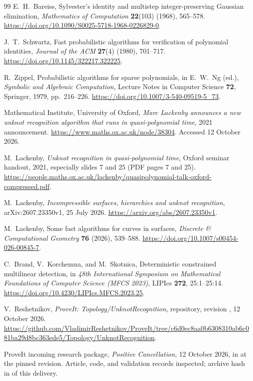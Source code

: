 \begin{thebibliography}{99}
E.~H.~Bareiss, Sylvester's identity and multistep integer-preserving
Gaussian elimination, \emph{Mathematics of Computation}
\textbf{22}(103) (1968), 565--578.
\url{https://doi.org/10.1090/S0025-5718-1968-0226829-0}.

J.~T.~Schwartz, Fast probabilistic algorithms for verification of
polynomial identities, \emph{Journal of the ACM} \textbf{27}(4)
(1980), 701--717. \url{https://doi.org/10.1145/322217.322225}.

R.~Zippel, Probabilistic algorithms for sparse polynomials,
in E.~W.~Ng (ed.), \emph{Symbolic and Algebraic Computation},
Lecture Notes in Computer Science \textbf{72}, Springer, 1979,
pp.~216--226. \url{https://doi.org/10.1007/3-540-09519-5_73}.

Mathematical Institute, University of Oxford,
\emph{Marc Lackenby announces a new unknot recognition algorithm that runs
in quasi-polynomial time}, 2021 announcement.
\url{https://www.maths.ox.ac.uk/node/38304}. Accessed 12 October 2026.

M.~Lackenby, \emph{Unknot recognition in quasi-polynomial time},
Oxford seminar handout, 2021, especially slides 7 and 25 (PDF pages 7 and 25).
\url{https://people.maths.ox.ac.uk/lackenby/quasipolynomial-talk-oxford-compressed.pdf}.

M.~Lackenby, \emph{Incompressible surfaces, hierarchies and unknot recognition},
arXiv:2607.23350v1, 25 July 2026.
\url{https://arxiv.org/abs/2607.23350v1}.

M.~Lackenby, Some fast algorithms for curves in surfaces,
\emph{Discrete \& Computational Geometry} \textbf{76} (2026), 539--588.
\url{https://doi.org/10.1007/s00454-026-00845-7}.

C.~Brand, V.~Korchemna, and M.~Skotnica,
Deterministic constrained multilinear detection,
in \emph{48th International Symposium on Mathematical Foundations of
Computer Science (MFCS 2023)}, LIPIcs \textbf{272}, 25:1--25:14.
\url{https://doi.org/10.4230/LIPIcs.MFCS.2023.25}.

V.~Reshetnikov, \emph{ProveIt: Topology/UnknotRecognition}, repository,
revision \pin, 12 October 2026.
\url{https://github.com/VladimirReshetnikov/ProveIt/tree/c6d0ec8aa0b6308310ab6c081ba29d8bc363ede5/Topology/UnknotRecognition}.

ProveIt incoming research package,
\emph{Positive Cancellation}, 12 October 2026,
 in
 at the pinned revision.
Article, code, and validation records inspected; archive hash in
 of this delivery.


\end{thebibliography}

